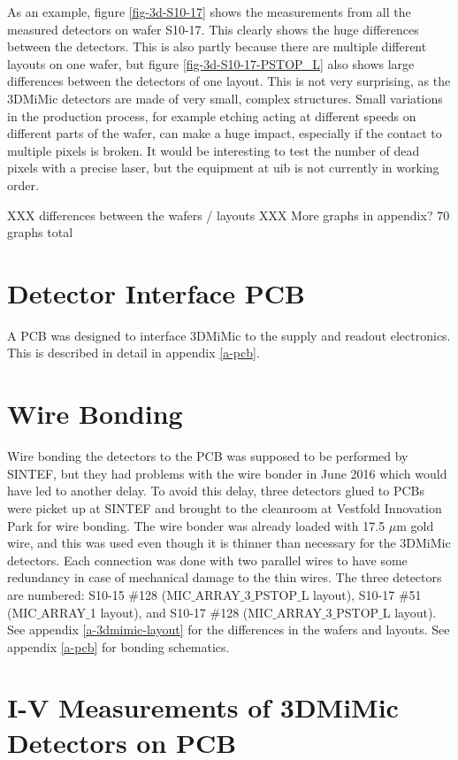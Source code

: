 \documentclass[../main/thesis.tex]{subfiles}
\begin{document}
As an example, figure \ref{fig-3d-S10-17} shows the measurements from all the measured detectors on wafer S10-17. This clearly shows the huge differences between the detectors. This is also partly because there are multiple different layouts on one wafer, but figure \ref{fig-3d-S10-17-PSTOP_L} also shows large differences between the detectors of one layout. This is not very surprising, as the 3DMiMic detectors are made of very small, complex structures. Small variations in the production process, for example etching acting at different speeds on different parts of the wafer, can make a huge impact, especially if the contact to multiple pixels is broken. It would be interesting to test the number of dead pixels with a precise laser, but the equipment at \gls{uib} is not currently in working order. 

XXX differences between the wafers / layouts
XXX More graphs in appendix? 70 graphs total

\section{Detector Interface PCB}
\label{3d-pcb}
A \gls{PCB} was designed to interface 3DMiMic to the supply and readout electronics. This is described in detail in appendix \ref{a-pcb}.

\section{Wire Bonding}
Wire bonding the detectors to the PCB was supposed to be performed by SINTEF, but they had problems with the wire bonder in June 2016 which would have led to another delay. To avoid this delay, three detectors glued to PCBs were picket up at SINTEF and brought to the cleanroom at Vestfold Innovation Park for wire bonding. The wire bonder was already loaded with 17.5 $\mu$m gold wire, and this was used even though it is thinner than necessary for the 3DMiMic detectors. Each connection was done with two parallel wires to have some redundancy in case of mechanical damage to the thin wires. The three detectors are numbered: S10-15 $\#$128 (MIC$\_$ARRAY$\_$3$\_$PSTOP$\_$L layout), S10-17 $\#$51 (MIC$\_$ARRAY$\_$1 layout), and S10-17 $\#$128 (MIC$\_$ARRAY$\_$3$\_$PSTOP$\_$L layout). See appendix \ref{a-3dmimic-layout} for the differences in the wafers and layouts.
See appendix \ref{a-pcb} for bonding schematics. 

\section{I-V Measurements of 3DMiMic Detectors on PCB}
\end{document}

